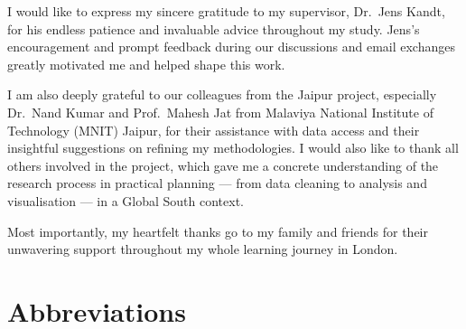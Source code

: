 \documentclass[
  12pt,
  oneside]{book}
\begin{document}
I would like to express my sincere gratitude to my supervisor, Dr.~Jens Kandt, for his endless patience and invaluable advice throughout my study. Jens's encouragement and prompt feedback during our discussions and email exchanges greatly motivated me and helped shape this work.

I am also deeply grateful to our colleagues from the Jaipur project, especially Dr.~Nand Kumar and Prof.~Mahesh Jat from Malaviya National Institute of Technology (MNIT) Jaipur, for their assistance with data access and their insightful suggestions on refining my methodologies. I would also like to thank all others involved in the project, which gave me a concrete understanding of the research process in practical planning --- from data cleaning to analysis and visualisation --- in a Global South context.

Most importantly, my heartfelt thanks go to my family and friends for their unwavering support throughout my whole learning journey in London.

\setcounter{tocdepth}{3}
\tableofcontents
\listoffigures
\listoftables

\chapter*{Abbreviations}\label{abbreviations}
\end{document}
